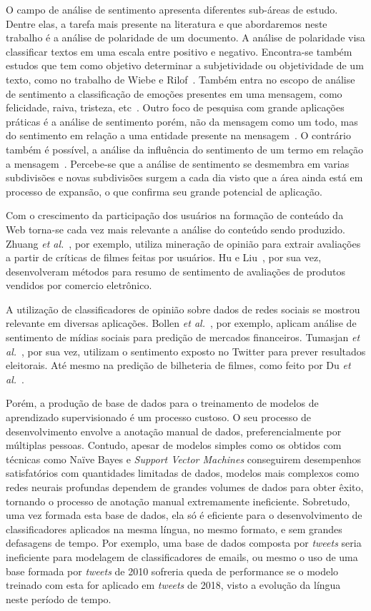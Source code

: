 O campo de análise de sentimento apresenta diferentes sub-áreas de estudo.
Dentre elas, a tarefa mais presente na literatura e que abordaremos neste trabalho é a análise de polaridade de um
documento.
A análise de polaridade visa classificar textos em uma escala entre positivo e negativo.
Encontra-se também estudos que tem como objetivo determinar a subjetividade ou objetividade de um texto, como no
trabalho de Wiebe e Rilof~\cite{Wiebe05}.
Também entra no escopo de análise de sentimento a classificação de emoções presentes em uma mensagem, como felicidade,
raiva, tristeza, etc~\cite{bollen11b}.
Outro foco de pesquisa com grande aplicações práticas é a análise de sentimento porém, não da mensagem como um todo, mas
do sentimento em relação a uma entidade presente na mensagem~\cite{eirinaki12}.
O contrário também é possível, a análise da influência do sentimento de um termo em relação a mensagem~\cite{socher13}.
Percebe-se que a análise de sentimento se desmembra em varias subdivisões e novas subdivisões surgem a cada dia visto
que a área ainda está em processo de expansão, o que confirma seu grande potencial de aplicação.

Com o crescimento da participação dos usuários na formação de conteúdo da Web torna-se cada vez mais relevante a análise
do conteúdo sendo produzido.
Zhuang \textit{et al.}~\cite{zhuang06}, por exemplo, utiliza mineração de opinião para extrair avaliações a partir de
críticas de filmes feitas por usuários.
Hu e Liu~\cite{hu04}, por sua vez, desenvolveram métodos para resumo de sentimento de avaliações de produtos vendidos
por comercio eletrônico.

A utilização de classificadores de opinião sobre dados de redes sociais se mostrou relevante em diversas aplicações.
Bollen \textit{et al.}~\cite{bollen11}, por exemplo, aplicam análise de sentimento de mídias sociais para predição de
mercados financeiros.
Tumasjan \textit{et al.}~\cite{tumasjan10}, por sua vez, utilizam o sentimento exposto no Twitter para prever resultados
eleitorais.
Até mesmo na predição de bilheteria de filmes, como feito por Du \textit{et al.}~\cite{du14}.

Porém, a produção de base de dados para o treinamento de modelos de aprendizado supervisionado é um processo custoso.
O seu processo de desenvolvimento envolve a anotação manual de dados, preferencialmente por múltiplas pessoas.
Contudo, apesar de modelos simples como os obtidos com técnicas como Naïve Bayes e \textit{Support Vector Machines}
conseguirem desempenhos satisfatórios com quantidades limitadas de dados, modelos mais complexos como redes neurais
profundas dependem de grandes volumes de dados para obter êxito, tornando o processo de anotação manual extremamente
ineficiente.
Sobretudo, uma vez formada esta base de dados, ela só é eficiente para o desenvolvimento de classificadores aplicados
na mesma língua, no mesmo formato, e sem grandes defasagens de tempo.
Por exemplo, uma base de dados composta por \textit{tweets} seria ineficiente para modelagem de classificadores de
emails, ou mesmo o uso de uma base formada por \textit{tweets} de 2010 sofreria queda de performance se o modelo
treinado com esta for aplicado em \textit{tweets} de 2018, visto a evolução da língua neste período de tempo.

